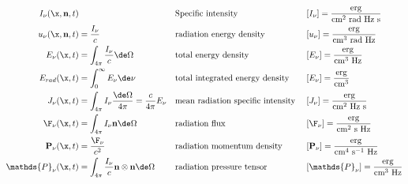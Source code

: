 \begin{align*}
	I_\nu (\x, \mathbf{n}, t) &
			&& \text{Specific intensity}
			&& [I_\nu] = \frac{\text{erg}}{\text{cm}^2 \text{ rad Hz s}} \\
	u_\nu (\x, \mathbf{n}, t) &= \frac{I_\nu}{c}
			&& \text{radiation energy density }
			&& [u_\nu] = \frac{\text{erg}}{\text{cm}^3 \text{ rad Hz}}\\
	E_\nu (\x, t) &= \int_{4 \pi} \frac{I_\nu}{c} \de \Omega
			&& \text{total energy density }
			&& [E_\nu] = \frac{\text{erg}}{\text{cm}^3 \text{ Hz}}\\
	E_{rad} (\x, t) &= \int_{0}^{\infty} E_\nu \de \nu
			&& \text{total integrated energy density }
			&& [E_\nu] = \frac{\text{erg}}{\text{cm}^3}\\
	J_\nu (\x, t) &= \int_{4 \pi} I_\nu \frac{\de \Omega}{4 \pi}
			= \frac{c}{4 \pi} E_\nu
			&& \text{mean radiation specific intensity }
			&& [J_\nu] = \frac{\text{erg}}{\text{cm}^2 \text{ Hz s}}\\
	\F_\nu(\x, t) &= \int_{4 \pi}  I_\nu \mathbf{n} \de \Omega
			&& \text{radiation flux }
			&& [\F_\nu] = \frac{\text{erg}}{\text{cm}^2 \text{ s Hz}}\\
	\mathbf{P}_\nu (\x, t) &= \frac{\F_\nu}{c^2}
			&& \text{radiation momentum density }
			&& [\mathbf{P}_\nu] = \frac{\text{erg}}{ \text{cm}^4 \text{ s}^{-1} \text{ Hz}}\\
	\mathds{P}_\nu (\x, t) &= \int_{4 \pi} \frac{I_\nu}{c} \mathbf{n} \otimes \mathbf{n} \de \Omega
			&& \text{radiation pressure tensor }
			&& [\mathds{P}_\nu ] = \frac{\text{erg}}{\text{cm}^3 \text{ Hz}}
\end{align*}



